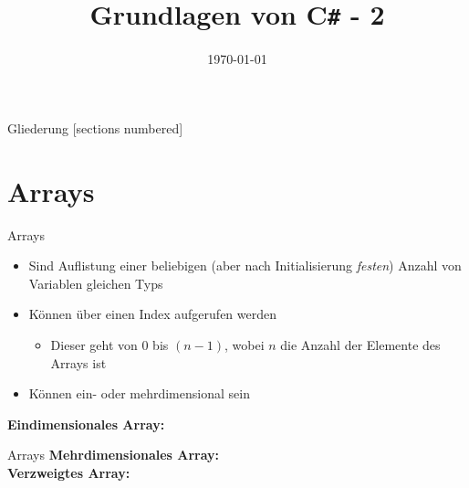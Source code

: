 



\title{Grundlagen von C\texttt{\#} - 2}
\date{\today}




\maketitle

\begin{frame}{Gliederung}
	[sections numbered]
	\tableofcontents
\end{frame}

\section{Arrays}
\begin{frame}{Arrays}
	\begin{itemize}
		\item Sind Auflistung einer beliebigen (aber nach Initialisierung \emph{festen}) Anzahl von Variablen gleichen Typs
		\item Können über einen Index aufgerufen werden
		\begin{itemize}
			\item Dieser geht von $0$ bis $(n - 1)$, wobei $n$ die Anzahl der Elemente des Arrays ist
		\end{itemize}
		\item Können ein- oder mehrdimensional sein
	\end{itemize}
	\textbf{Eindimensionales Array:}\\
		
\end{frame}

\begin{frame}{Arrays}
	\textbf{Mehrdimensionales Array:}\\
		
	\textbf{Verzweigtes Array:}\\
	
\end{frame}

